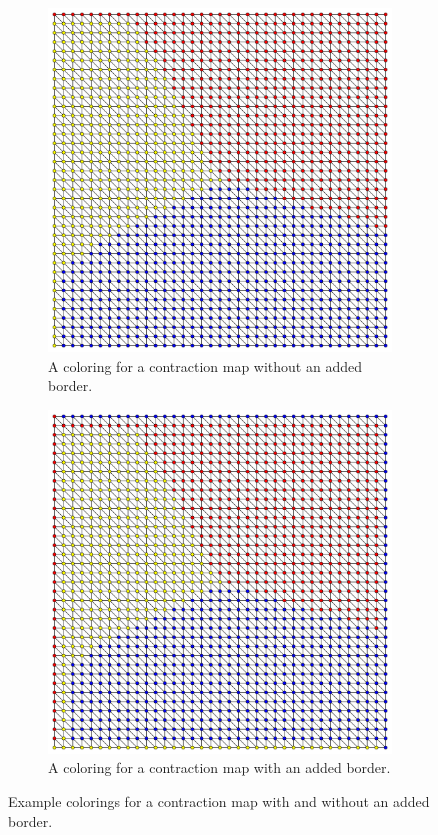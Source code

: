   \begin{figure}
    \centering
    \begin{subfigure}[h]{0.7\textwidth}
      \includegraphics[width=\textwidth]{ContractionToEOPL_example1_WithoutBorder}
      \caption{A coloring for a contraction map without an added border.}
      \label{fig:withoutBorder}
    \end{subfigure}
    \begin{subfigure}[h]{0.7\textwidth}
      \includegraphics[width=\textwidth]{ContractionToEOPL_example1_WithBorder}
      \caption{A coloring for a contraction map with an added border.}
      \label{fig:withBorder}
    \end{subfigure}    
    \caption{Example colorings for a contraction map with and without an added border.}
    \label{fig:withAndWithoutBorder}
  \end{figure}


